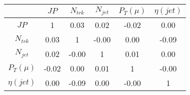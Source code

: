 \begin{tabular}{|c|c|c|c|c|c|} 
\hline
 & $JP$ & $N_{trk}$ & $N_{jet}$ & $P_{T} (\mu)$ & $\eta (jet)$ \\ \hline
$JP$ & 1 & 0.03 & 0.02 & -0.02 & 0.00 \\
$N_{trk}$ & 0.03 & 1 & -0.00 & 0.00 & -0.09 \\
$N_{jet}$ & 0.02 & -0.00 & 1 & 0.01 & 0.00 \\
$P_{T} (\mu)$ & -0.02 & 0.00 & 0.01 & 1 & -0.00 \\
$\eta (jet)$ & 0.00 & -0.09 & 0.00 & -0.00 & 1 \\
\hline 
\end{tabular} 


